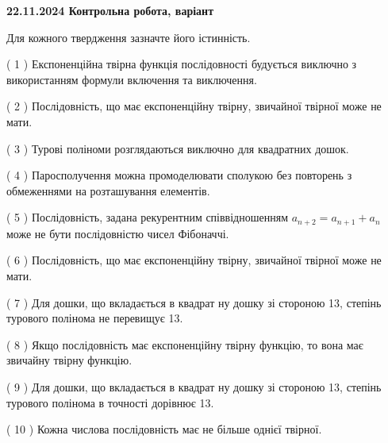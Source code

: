 \documentclass[12pt, ukrainian]{article}
\begin{document}
\vspace{4mm}
\newpage
\begin {large}

\textbf{22.11.2024 Контрольна робота, варіант  }\par


{
Для кожного твердження зазначте його істинність.\par
\vspace{2mm}
( 1 ) Експоненційна твірна функція послідовності будується виключно з використанням формули включення та виключення.%

( 2 ) Послідовність, що має експоненційну твірну, звичайної твірної може не мати.%

( 3 ) Турові поліноми розглядаються виключно для квадратних дошок.%

( 4 ) Паросполучення можна промоделювати сполукою без повторень з обмеженнями на розташування елементів.%

( 5 ) Послідовність, задана рекурентним співвідношенням $a_{n+2}=a_{n+1}+a_{n}$ може не бути послідовністю чисел Фібоначчі.%

( 6 ) Послідовність, що має експоненційну твірну, звичайної твірної може не мати.%

( 7 ) Для дошки, що вкладається в квадрат ну дошку зі стороною 13, степінь турового полінома не перевищує 13.%

( 8 ) Якщо послідовність має експоненційну твірну функцію, то вона має звичайну твірну функцію.%

( 9 ) Для дошки, що вкладається в квадрат ну дошку зі стороною 13, степінь турового полінома в точності дорівнює 13.%

( 10 ) Кожна числова послідовність має не більше однієї твірної.%


\vspace{5mm}
}
\end {large}
\end{document}
